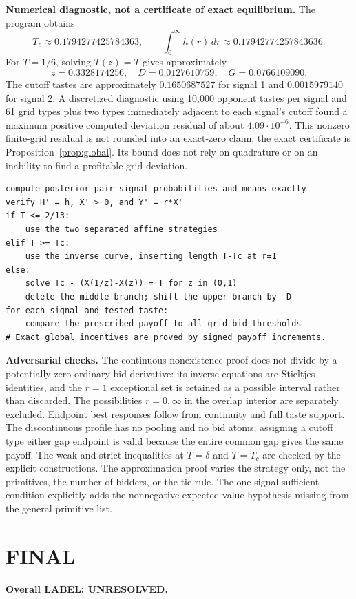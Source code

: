 \documentclass[11pt,a4paper]{article}
\theoremstyle{remark}\newtheorem{remark}[theorem]{Remark}
\begin{document}
\textbf{Numerical diagnostic, not a certificate of exact equilibrium.} The program obtains
\[
 T_c\approx0.1794277425784363,\qquad
 \int_0^\infty h(r)\,dr\approx0.17942774257843636.
\]
For $T=1/6$, solving $T(z)=T$ gives approximately
\[
 z=0.3328174256,\quad D=0.0127610759,\quad G=0.0766109090.
\]
The cutoff tastes are approximately $0.1650687527$ for signal 1 and $0.0015979140$ for signal 2. A discretized diagnostic using 10,000 opponent tastes per signal and 61 grid types plus two types immediately adjacent to each signal's cutoff found a maximum positive computed deviation residual of about $4.09\cdot10^{-6}$. This nonzero finite-grid residual is not rounded into an exact-zero claim; the exact certificate is Proposition~\ref{prop:global}. Its bound does not rely on quadrature or on an inability to find a profitable grid deviation.
\begin{lstlisting}
compute posterior pair-signal probabilities and means exactly
verify H' = h, X' > 0, and Y' = r*X'
if T <= 2/13:
    use the two separated affine strategies
elif T >= Tc:
    use the inverse curve, inserting length T-Tc at r=1
else:
    solve Tc - (X(1/z)-X(z)) = T for z in (0,1)
    delete the middle branch; shift the upper branch by -D
for each signal and tested taste:
    compare the prescribed payoff to all grid bid thresholds
# Exact global incentives are proved by signed payoff increments.
\end{lstlisting}

\textbf{Adversarial checks.} The continuous nonexistence proof does not divide by a potentially zero ordinary bid derivative: its inverse equations are Stieltjes identities, and the $r=1$ exceptional set is retained as a possible interval rather than discarded. The possibilities $r=0,\infty$ in the overlap interior are separately excluded. Endpoint best responses follow from continuity and full taste support. The discontinuous profile has no pooling and no bid atoms; assigning a cutoff type either gap endpoint is valid because the entire common gap gives the same payoff. The weak and strict inequalities at $T=\delta$ and $T=T_c$ are checked by the explicit constructions. The approximation proof varies the strategy only, not the primitives, the number of bidders, or the tie rule. The one-signal sufficient condition explicitly adds the nonnegative expected-value hypothesis missing from the general primitive list.

\section{FINAL}
\textbf{Overall LABEL: UNRESOLVED.}
\end{document}
